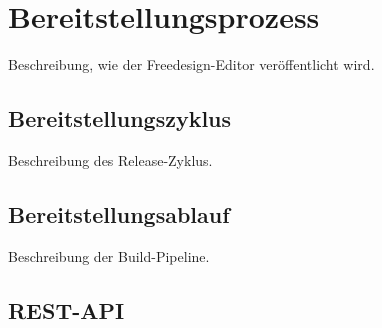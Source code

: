 \section{Bereitstellungsprozess}
Beschreibung, wie der Freedesign-Editor veröffentlicht wird.

\subsection{Bereitstellungszyklus}
Beschreibung des Release-Zyklus.

\subsection{Bereitstellungsablauf}
Beschreibung der Build-Pipeline.

\subsection{REST-API}

